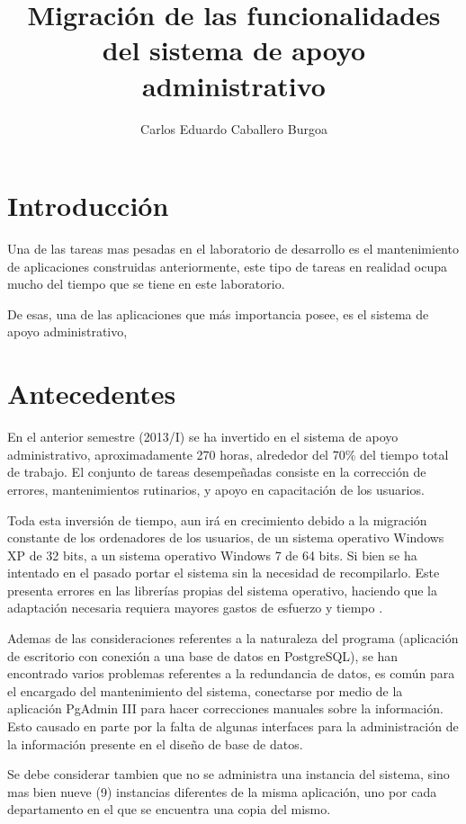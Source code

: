 \documentclass[letterpaper,11pt]{article}
\title{Migración de las funcionalidades del sistema de apoyo administrativo}
\author{Carlos Eduardo Caballero Burgoa}
\begin{document}
\maketitle
\section{Introducción}
Una de las tareas mas pesadas en el laboratorio de desarrollo es el 
mantenimiento de aplicaciones construidas anteriormente, este tipo de tareas en
realidad ocupa mucho del tiempo que se tiene en este laboratorio.

De esas, una de las aplicaciones que más importancia posee, es el sistema de
apoyo administrativo, 

\section{Antecedentes}
En el anterior semestre (2013/I) se ha invertido en el sistema de apoyo
administrativo, aproximadamente 270 horas, alrededor del 70\% del tiempo
total de trabajo. El conjunto de tareas desempeñadas consiste en la corrección
de errores, mantenimientos rutinarios, y apoyo en capacitación de los usuarios.

Toda esta inversión de tiempo, aun irá en crecimiento debido a la migración
constante de los ordenadores de los usuarios, de un sistema operativo Windows
XP de 32 bits, a un sistema operativo Windows 7 de 64 bits. Si bien se ha
intentado en el pasado portar el sistema sin la necesidad de recompilarlo. Este
presenta errores en las librerías propias del sistema operativo, haciendo que
la adaptación necesaria requiera mayores gastos de esfuerzo y tiempo
\cite{Delphi1}.

Ademas de las consideraciones referentes a la naturaleza del programa
(aplicación de escritorio con conexión a una base de datos en PostgreSQL), se 
han encontrado varios problemas referentes a la redundancia de datos, es común
para el encargado del mantenimiento del sistema, conectarse por medio de la
aplicación PgAdmin III para hacer correcciones manuales sobre la información.
Esto causado en parte por la falta de algunas interfaces para la administración
de la información presente en el diseño de base de datos.

Se debe considerar tambien que no se administra una instancia del sistema, sino
mas bien nueve (9) instancias diferentes de la misma aplicación, uno por cada
departamento en el que se encuentra una copia del mismo.
\end{document}
